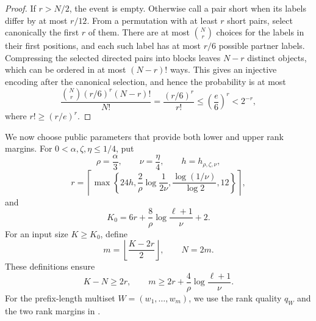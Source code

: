 \documentclass[11pt]{article}
\begin{document}
\begin{proof}
If $r>N/2$, the event is empty.  Otherwise call a pair short when its labels
differ by at most $r/12$.  From a permutation with at least $r$ short pairs,
select canonically the first $r$ of them.  There are at most $\binom Nr$
choices for the labels in their first positions, and each such label has at
most $r/6$ possible partner labels.  Compressing the selected directed pairs
into blocks leaves $N-r$ distinct objects, which can be ordered in at most
$(N-r)!$ ways.  This gives an injective encoding after the canonical
selection, and hence the probability is at most
\[
 \frac{\binom Nr(r/6)^r(N-r)!}{N!}
 =\frac{(r/6)^r}{r!}
 \le\left(\frac e6\right)^r<2^{-r},
\]
where $r!\ge(r/e)^r$.
\end{proof}

We now choose public parameters that provide both lower and upper rank
margins.  For $0<\alpha,\zeta,\eta\le1/4$, put
\begin{equation}
 \rho=\frac\alpha3,
 \qquad \nu=\frac\eta4,
 \qquad h=h_{\rho,\zeta,\nu},
 \label{eq:one-level-basic-parameters}
\end{equation}
\begin{equation}
 r=\left\lceil\max\left\{
  24h,
  \frac2\rho\log\frac1{2\nu},
  \frac{\log(1/\nu)}{\log2},
  12
 \right\}\right\rceil,
 \label{eq:rank-guard}
\end{equation}
and
\begin{equation}
 K_0=6r+\frac8\rho\log\frac{\ell+1}{\nu}+2.
 \label{eq:exact-sample-threshold}
\end{equation}
For an input size $K\ge K_0$, define
\begin{equation}
 m=\left\lfloor\frac{K-2r}{2}\right\rfloor,
 \qquad N=2m.
 \label{eq:bottom-size}
\end{equation}
These definitions ensure
\begin{equation}
 K-N\ge2r,
 \qquad
 m\ge2r+\frac4\rho\log\frac{\ell+1}{\nu}.
 \label{eq:pair-count-lower}
\end{equation}
For the prefix-length multiset $W=(w_1,\ldots,w_m)$, we use the rank
quality $q_W$ and the two rank margins in
.
\end{document}
